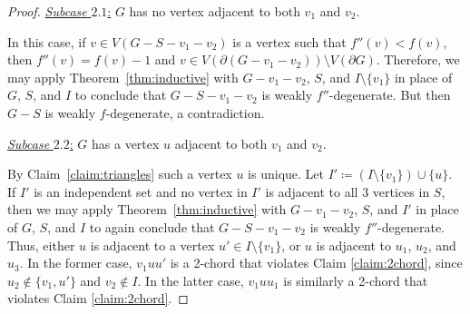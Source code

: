 \documentclass[11pt]{article}
\theoremstyle{slantthm}
\numberwithin{equation}{section}
\theoremstyle{definition}
\newcommand{\defeq}{\coloneqq}
\numberwithin{equation}{section}
\newcommand{\0}{\varnothing}
\newcommand{\set}[1]{\{#1\}}
\newcommand{\bdry}[1]{{\partial #1}}
\begin{document}
\begin{proof}
    \smallskip
    
    \underline{\emph{Subcase} $2.1$:} $G$ has no vertex adjacent to both $v_1$ and $v_2$.

    \smallskip
    
        In this case, if $v \in V(G - S - v_1 - v_2)$ is a vertex such that $f''(v) < f(v)$, then $f''(v) = f(v) - 1$ and $v \in V(\bdry{(G-v_1 - v_2)}) \setminus V(\bdry{G})$. Therefore, we may apply Theorem~\ref{thm:inductive} with $G - v_1 - v_2$, $S$, and $I \setminus \set{v_1}$ in place of $G$, $S$, and $I$ to conclude that $G-S - v_1 - v_2$ is weakly $f''$-degenerate. But then $G - S$ is weakly $f$-degenerate, a contradiction. %

        \smallskip
    
    \underline{\emph{Subcase} $2.2$:} $G$ has a vertex $u$ adjacent to both $v_1$ and $v_2$.

    \smallskip
        
        By Claim~\ref{claim:triangles} such a vertex $u$ is unique. Let $I' \defeq (I\setminus \{v_1\}) \cup \{u\}$. If $I'$ is an independent set and no vertex in $I'$ is adjacent to all $3$ vertices in $S$, then we may apply Theorem~\ref{thm:inductive} with $G - v_1 - v_2$, $S$, and $I'$ in place of $G$, $S$, and $I$ to again conclude that $G - S - v_1 - v_2$ is weakly $f''$-degenerate. Thus, either $u$ is adjacent to a vertex $u' \in I\setminus \set{v_1}$, or $u$ is adjacent to $u_1$, $u_2$, and $u_3$. In the former case, $v_1uu'$ is a 2-chord that violates Claim \ref{claim:2chord}, since $u_2 \notin \set{v_1, u'}$ and $v_2 \notin I$. %
        In the latter case, $v_1uu_1$ is similarly a 2-chord that violates Claim \ref{claim:2chord}.
    \end{proof}
\end{document}
